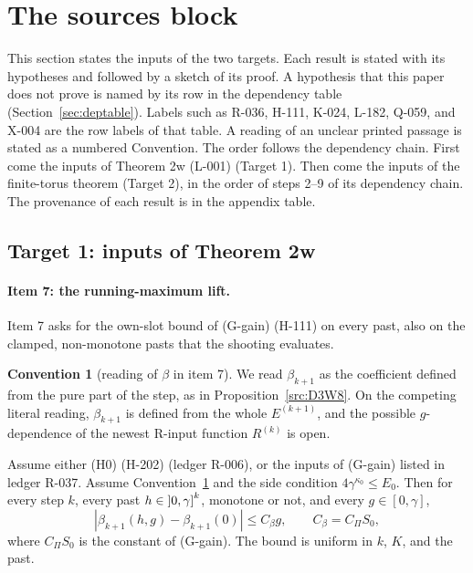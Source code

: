 \section{The sources block}\label{sec:sources}

\ifdefined\convention\else\theoremstyle{definition}\newtheorem{convention}[theorem]{Convention}\theoremstyle{plain}\fi

This section states the inputs of the two targets. Each result is stated with its hypotheses and followed by a sketch of its proof. A hypothesis that this paper does not prove is named by its row in the dependency table (Section~\ref{sec:deptable}). Labels such as R-036, H-111, K-024, L-182, Q-059, and X-004 are the row labels of that table. A reading of an unclear printed passage is stated as a numbered Convention. The order follows the dependency chain. First come the inputs of Theorem 2w (L-001) (Target 1). Then come the inputs of the finite-torus theorem (Target 2), in the order of steps 2--9 of its dependency chain. The provenance of each result is in the appendix table.

\subsection{Target 1: inputs of Theorem 2w}\label{sec:src-T1}

\paragraph{Item 7: the running-maximum lift.}
Item 7 asks for the own-slot bound of (G-gain) (H-111) on every past, also on the clamped, non-monotone pasts that the shooting evaluates.

\begin{convention}[reading of $\beta$ in item 7]\label{conv:src-beta-pure}
We read $\beta_{k+1}$ as the coefficient defined from the pure part of the step, as in Proposition~\ref{src:D3W8}. On the competing literal reading, $\beta_{k+1}$ is defined from the whole $E^{(k+1)}$, and the possible $g$-dependence of the newest R-input function $R^{(k)}$ is open.
\end{convention}

\begin{proposition}\label{src:GGAIN-NONMONO}
Assume either (H0) (H-202) (ledger R-006), or the inputs of (G-gain) listed in ledger R-037. Assume Convention~\ref{conv:src-beta-pure} and the side condition $4\gamma^{\kappa_0}\le E_0$. Then for every step $k$, every past $h\in\mathopen{]}0,\gamma\mathclose{]}^k$, monotone or not, and every $g\in[0,\gamma]$,
\[
|\beta_{k+1}(h,g)-\beta_{k+1}(0)|\le C_\beta g,\qquad C_\beta=C_\Pi S_0,
\]
where $C_\Pi S_0$ is the constant of (G-gain). The bound is uniform in $k$, $K$, and the past.
\end{proposition}

